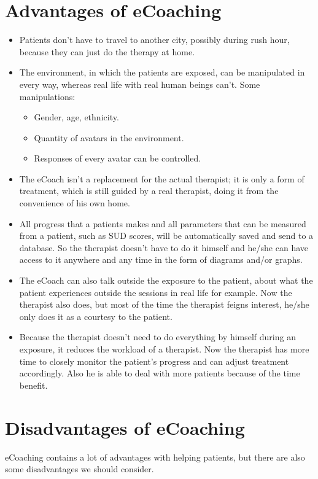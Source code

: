 \documentclass[english,a4paper,pdftex]{report}
\begin{document}
\chapter{Advantages of eCoaching}
\begin{itemize}
\item Patients don't have to travel to another city, possibly during rush hour, because they can just do the therapy at home.
\item The environment, in which the patients are exposed, can be manipulated in every way, whereas real life with real human beings can't. 
Some manipulations:
	\begin{itemize}
	\item Gender, age, ethnicity.
	\item Quantity of avatars in the environment.
	\item Responses of every avatar can be controlled.
	\end{itemize}
\item The eCoach isn't a replacement for the actual therapist; it is only a form of treatment, which is still guided by a real therapist, doing it from the convenience of his own home.
\item All progress that a patients makes and all parameters that can be measured from a patient, such as SUD scores, will be automatically saved and send to a database. So the therapist doesn't have to do it himself and he/she can have access to it anywhere and any time in the form of diagrams and/or graphs.
\item The eCoach can also talk outside the exposure to the patient, about what the patient experiences outside the sessions in real life for example. Now the therapist also does, but most of the time the therapist feigns interest, he/she only does it as a courtesy to the patient.
\item Because the therapist doesn't need to do everything by himself during an exposure, it reduces the workload of a therapist. Now the therapist has more time to closely monitor the patient's progress and can adjust treatment accordingly.  Also he is able to deal with more patients because of the time benefit.\cite{ter2011design}
\end{itemize}



\chapter{Disadvantages of eCoaching}
eCoaching contains a lot of advantages with helping patients, but there are also some disadvantages we should consider. 
\end{document}
